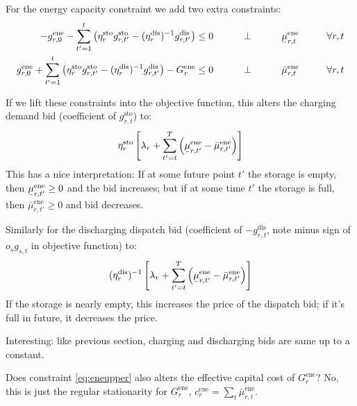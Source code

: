 \documentclass[final,3p,times]{elsarticle}
\newcommand{\ubar}[1]{\text{\b{$#1$}}}
\def\l{\lambda}
\begin{document}
For the energy capacity constraint  we add two extra constraints:
\begin{align}
  -g^{\textrm{ene}}_{r,0} - \sum_{t'=1}^t \left( \eta^{\textrm{sto}}_r g^{\textrm{sto}}_{r,t'} - (\eta^{\textrm{dis}}_r)^{-1} g^{\textrm{dis}}_{r,t'} \right) \leq  0  \hspace{1cm}\perp \hspace{1cm} \ubar{\mu}^{\textrm{ene}}_{r,t} \hspace{1cm} \forall r,t \label{eq:enelower} \\
  g^{\textrm{ene}}_{r,0} + \sum_{t'=1}^t \left( \eta^{\textrm{sto}}_r g^{\textrm{sto}}_{r,t'} - (\eta^{\textrm{dis}}_r)^{-1} g^{\textrm{dis}}_{r,t'} \right) - G^{\textrm{ene}}_r \leq  0  \hspace{1cm}\perp \hspace{1cm} \bar{\mu}^{\textrm{ene}}_{r,t} \hspace{1cm} \forall r,t \label{eq:eneupper}
\end{align}


If we lift these constraints into the objective function, this alters the charging demand bid (coefficient of  $g^{\textrm{sto}}_{r,t}$) to:
\begin{equation}
   \eta^{\textrm{sto}}_r \left[ \l_r + \sum_{t'=t}^T \left( \ubar{\mu}^{\textrm{ene}}_{r,t'} -\bar{\mu}^{\textrm{ene}}_{r,t'}  \right) \right]
\end{equation}
This has a nice interpretation: If at some future point $t'$ the storage is empty, then $\ubar{\mu}^{\textrm{ene}}_{r,t'} \geq 0$  and the bid increases; but if at some time $t'$ the storage is full, then
$\bar{\mu}^{\textrm{ene}}_{r,t'} \geq 0$ and bid decreases.

Similarly for the discharging dispatch bid (coefficient of  $-g^{\textrm{dis}}_{r,t}$, note minus sign of $o_sg_{s,t}$ in objective function) to:
\begin{equation}
   (\eta^{\textrm{dis}}_r)^{-1}\left[ \l_r + \sum_{t'=t}^T \left(\ubar{\mu}^{\textrm{ene}}_{r,t'} - \bar{\mu}^{\textrm{ene}}_{r,t'}  \right)\right]
\end{equation}
If the storage is nearly empty, this increases the price of the dispatch bid; if it's full in future, it decreases the price.

Interesting: like previous section, charging and discharging bids are same up to a constant.

Does constraint \eqref{eq:eneupper} also alters the effective capital cost of $G^{\textrm{ene}}_r$? No, this is just the regular stationarity for $G^{\textrm{ene}}_r$, $ c^{\textrm{ene}}_r = \sum_t \bar{\mu}^{\textrm{ene}}_{r,t}$.
\end{document}
